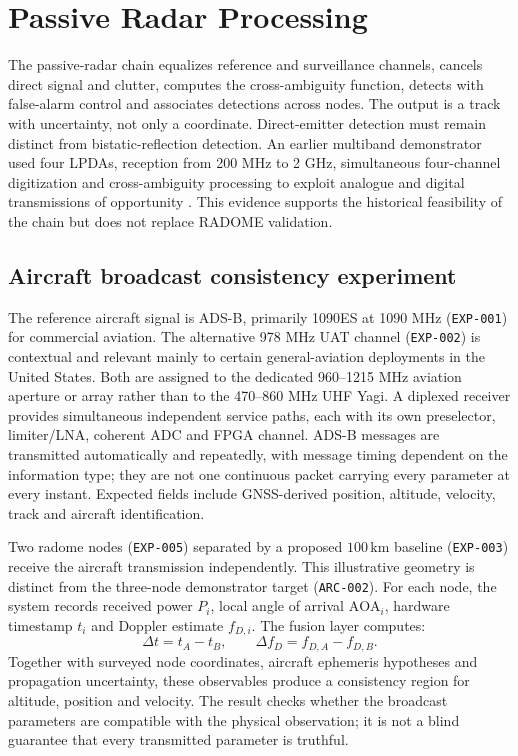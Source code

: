 \chapter{Passive Radar Processing}

The passive-radar chain equalizes reference and surveillance channels, cancels direct signal and clutter, computes the cross-ambiguity function, detects with false-alarm control and associates detections across nodes. The output is a track with uncertainty, not only a coordinate. Direct-emitter detection must remain distinct from bistatic-reflection detection. An earlier multiband demonstrator used four LPDAs, reception from 200 MHz to 2 GHz, simultaneous four-channel digitization and cross-ambiguity processing to exploit analogue and digital transmissions of opportunity \cite{gould2006multiband}. This evidence supports the historical feasibility of the chain but does not replace RADOME validation.

\section{Aircraft broadcast consistency experiment}
The reference aircraft signal is ADS-B, primarily 1090ES at 1090 MHz (\texttt{EXP-001}) for commercial aviation. The alternative 978 MHz UAT channel (\texttt{EXP-002}) is contextual and relevant mainly to certain general-aviation deployments in the United States. Both are assigned to the dedicated 960--1215 MHz aviation aperture or array rather than to the 470--860 MHz UHF Yagi. A diplexed receiver provides simultaneous independent service paths, each with its own preselector, limiter/LNA, coherent ADC and FPGA channel. ADS-B messages are transmitted automatically and repeatedly, with message timing dependent on the information type; they are not one continuous packet carrying every parameter at every instant. Expected fields include GNSS-derived position, altitude, velocity, track and aircraft identification.

Two radome nodes (\texttt{EXP-005}) separated by a proposed $100\,\mathrm{km}$ baseline (\texttt{EXP-003}) receive the aircraft transmission independently. This illustrative geometry is distinct from the three-node demonstrator target (\texttt{ARC-002}). For each node, the system records received power $P_i$, local angle of arrival $\mathrm{AOA}_i$, hardware timestamp $t_i$ and Doppler estimate $f_{D,i}$. The fusion layer computes:
\[
\Delta t=t_A-t_B,\qquad \Delta f_D=f_{D,A}-f_{D,B}.
\]
Together with surveyed node coordinates, aircraft ephemeris hypotheses and propagation uncertainty, these observables produce a consistency region for altitude, position and velocity. The result checks whether the broadcast parameters are compatible with the physical observation; it is not a blind guarantee that every transmitted parameter is truthful.

